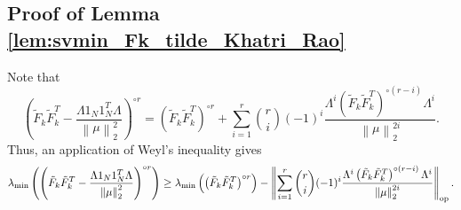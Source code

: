 \documentclass[11pt]{article}
\newcommand{\revision}[1]{#1}
\newenvironment{proof}{\par\noindent{\bf Proof:\ }}{\hfill$\Box$\\[2mm]}
\newcommand{\norm}[1]{\left\|#1\right\|}
\newcommand{\evmin}[1]{\lambda_{\rm min}\left(#1\right)}
\begin{document}
\subsection{Proof of Lemma \ref{lem:svmin_Fk_tilde_Khatri_Rao}}\label{app:lem:svmin_Fk_tilde_Khatri_Rao}
\revision{Note that 
\begin{equation}
\left(\tilde F_{k} \tilde F_{k}^T -\frac{\Lambda 1_N 1_N^T\Lambda}{\norm{\mu}_2^2}\right)^{\circ r} = \left(\tilde F_{k} \tilde F_{k}^T\right)^{\circ r} + \sum_{i=1}^r {r \choose i}(-1)^i\frac{\Lambda^i\left(\tilde F_{k} \tilde F_{k}^T\right)^{\circ (r-i)}\Lambda^i}{\norm{\mu}_2^{2i}}.
\end{equation}
Thus, an application of Weyl's inequality gives
\begin{equation}\label{eq:Win}
\evmin{\left(\tilde F_{k} \tilde F_{k}^T -\frac{\Lambda 1_N 1_N^T\Lambda}{\norm{\mu}_2^2}\right)^{\circ r}}\ge \evmin{\left(\tilde F_{k} \tilde F_{k}^T\right)^{\circ r}}-\left\|\sum_{i=1}^r {r \choose i}(-1)^i\frac{\Lambda^i\left(\tilde F_{k} \tilde F_{k}^T\right)^{\circ (r-i)}\Lambda^i}{\norm{\mu}_2^{2i}}\right\|_{\rm op}.
\end{equation}}
\end{document}

